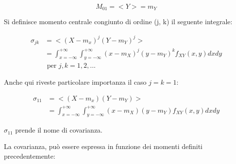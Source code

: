 {
    \Large 
    \begin{equation}
        M_{0 1} = <Y> = m_Y
    \end{equation}
}

Si definisce momento centrale congiunto di ordine (j, k) il seguente integrale:

{
    \Large 
    \begin{equation}
        \begin{split}
            \sigma_{jk}
            &= 
            <(X - m_x)^{j} (Y - m_Y)^{j} >
            \\
            &= 
            \int_{x = -\infty}^{+ \infty}
            \int_{y = -\infty}^{+ \infty}
            (x - m_X)^{j}
            (y - m_Y)^{k} 
            f_{XY} (x, y) 
            dx dy 
            \\
            &\text{ per }
            j, k = 1, 2, ...
        \end{split}
    \end{equation}
}


Anche qui riveste particolare importanza il caso $j=k=1$: 

{
    \Large 
    \begin{equation}
        \begin{split}
            \sigma_{11}
            &= 
            <(X - m_x) (Y - m_Y) >
            \\
            &= 
            \int_{x = -\infty}^{+ \infty}
            \int_{y = -\infty}^{+ \infty}
            (x - m_X)
            (y - m_Y) 
            f_{XY} (x, y) 
            dx dy 
        \end{split}
    \end{equation}
}

$\sigma_{11}$ prende il nome di covarianza. \newline 

La covarianza, può essere espressa in funzione dei momenti definiti precedentemente: 

